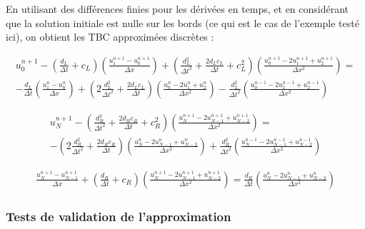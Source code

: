 \indent En utilisant des différences finies pour les dérivées en temps, et en considérant que la solution initiale est nulle sur les bords (ce qui est le cas de l'exemple testé ici), on obtient les TBC approximées discrètes : 

\begin{equation*}
\label{eq:appDiscTBCP1}
	\begin{gathered}
    u_0^{n+1} - \left( \frac{d_L}{\Delta t} + c_L \right) \left( \frac{u_1^{n+1} - u_0^{n+1}}{\Delta x}\right) +   \left( \frac{d_L^2}{\Delta t^2} + \frac{2d_Lc_L}{\Delta t} + c_L^2  \right) \left(  \frac{u_0^{n+1} - 2u_1^{n+1} + u_2^{n+1}}{\Delta x^2} \right)  = \\
        -\frac{d_L}{\Delta t}\left( \frac{u_1^{n} - u_0^{n}}{\Delta x}\right) +  \left( 2\frac{d_L^2}{\Delta t^2} + \frac{2d_Lc_L}{\Delta t}\right) \left(  \frac{u_0^{n} - 2u_1^n + u_2^{n}}{\Delta x^2} \right)    -  \frac{d_L^2}{\Delta t^2} \left(  \frac{u_0^{n-1} - 2u_1^{n-1} + u_2^{n-1}}{\Delta x^2} \right)
   \end{gathered}
\end{equation*} 

\begin{equation*}
	\begin{aligned}
    u_N^{n+1} - \left( \frac{d_R^2}{\Delta t^2} + \frac{2d_Rc_R}{\Delta t} + c_R^2  \right) \left(  \frac{u_{N}^{n+1} - 2u_{N-1}^{n+1} + u_{N-2}^{n+1}}{\Delta x^2} \right) = \\
     -\left( 2\frac{d_R^2}{\Delta t^2} + \frac{2d_Rc_R}{\Delta t}\right) \left(  \frac{u_N^{n} - 2u_{N-1}^n + u_{N-2}^{n}}{\Delta x^2} \right) + \frac{d_R^2}{\Delta t^2} \left(  \frac{u_N^{n-1} - 2u_{N-1}^{n-1} + u_{N-2}^{n-1}}{\Delta x^2} \right)
    \end{aligned}
\end{equation*} 
   
\begin{equation*}
	\begin{aligned}	
    \frac{u_N^{n+1} - u_{N-1}^{n+1}}{\Delta x} + \left( \frac{d_R}{\Delta t} + c_R \right) \left( \frac{u_N^{n+1} -2 u_{N-1}^{n+1} + u_{N-2}^{n+1}}{\Delta x^2}\right) =      \frac{d_R}{\Delta t}\left( \frac{u_{N}^{n} - 2u_{N-1}^{n} + u_{N-2}^n}{\Delta x^2}\right)
    \end{aligned}
\end{equation*}

\subsubsection{Tests de validation de l'approximation}

